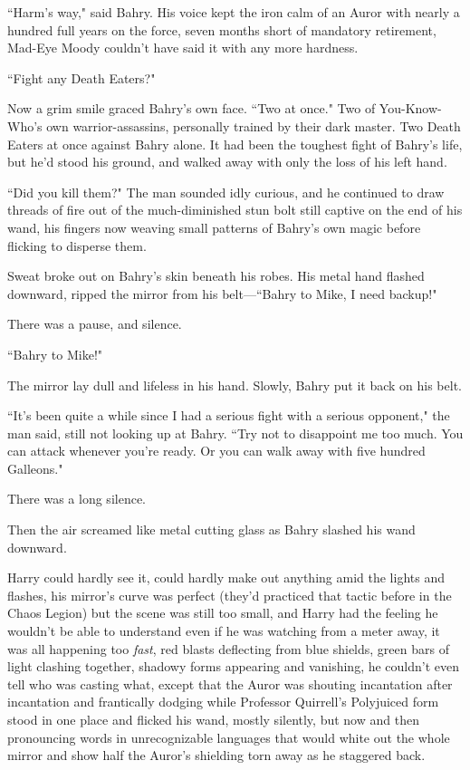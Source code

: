 ``Harm's way," said Bahry. His voice kept the iron calm of an Auror with nearly a hundred full years on the force, seven months short of mandatory retirement, Mad-Eye Moody couldn't have said it with any more hardness.

``Fight any Death Eaters?"

Now a grim smile graced Bahry's own face. ``Two at once." Two of You-Know-Who's own warrior-assassins, personally trained by their dark master. Two Death Eaters at once against Bahry alone. It had been the toughest fight of Bahry's life, but he'd stood his ground, and walked away with only the loss of his left hand.

``Did you kill them?" The man sounded idly curious, and he continued to draw threads of fire out of the much-diminished stun bolt still captive on the end of his wand, his fingers now weaving small patterns of Bahry's own magic before flicking to disperse them.

Sweat broke out on Bahry's skin beneath his robes. His metal hand flashed downward, ripped the mirror from his belt---``Bahry to Mike, I need backup!"

There was a pause, and silence.

``Bahry to Mike!"

The mirror lay dull and lifeless in his hand. Slowly, Bahry put it back on his belt.

``It's been quite a while since I had a serious fight with a serious opponent," the man said, still not looking up at Bahry. ``Try not to disappoint me too much. You can attack whenever you're ready. Or you can walk away with five hundred Galleons."

There was a long silence.

Then the air screamed like metal cutting glass as Bahry slashed his wand downward.

\later

Harry could hardly see it, could hardly make out anything amid the lights and flashes, his mirror's curve was perfect (they'd practiced that tactic before in the Chaos Legion) but the scene was still too small, and Harry had the feeling he wouldn't be able to understand even if he was watching from a meter away, it was all happening too \emph{fast}, red blasts deflecting from blue shields, green bars of light clashing together, shadowy forms appearing and vanishing, he couldn't even tell who was casting what, except that the Auror was shouting incantation after incantation and frantically dodging while Professor Quirrell's Polyjuiced form stood in one place and flicked his wand, mostly silently, but now and then pronouncing words in unrecognizable languages that would white out the whole mirror and show half the Auror's shielding torn away as he staggered back.

